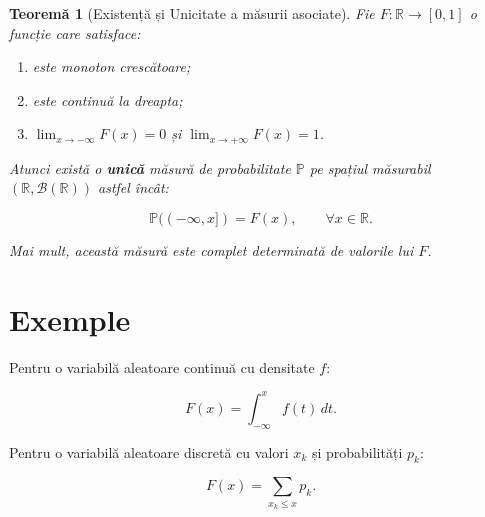 \documentclass[12pt]{article}
\theoremstyle{plain}
\newtheorem{theorem}{Teoremă}
\begin{document}
\begin{theorem}[Existență și Unicitate a măsurii asociate]
Fie $F : \mathbb{R} \to [0,1]$ o funcție care satisface:

\begin{enumerate}
    \item este monoton crescătoare;
    \item este continuă la dreapta;
    \item $\displaystyle \lim_{x \to -\infty} F(x) = 0$ și 
          $\displaystyle \lim_{x \to +\infty} F(x) = 1$.
\end{enumerate}

Atunci există o \textbf{unică} măsură de probabilitate 
$\mathbb{P}$ pe spațiul măsurabil $(\mathbb{R}, \mathcal{B}(\mathbb{R}))$ astfel încât:



\[
\mathbb{P}((-\infty, x]) = F(x), \qquad \forall x \in \mathbb{R}.
\]



Mai mult, această măsură este complet determinată de valorile lui $F$.
\end{theorem}

\section{Exemple}

Pentru o variabilă aleatoare continuă cu densitate $f$:


\[
F(x) = \int_{-\infty}^{x} f(t)\, dt.
\]



Pentru o variabilă aleatoare discretă cu valori $x_k$ și probabilități $p_k$:


\[
F(x) = \sum_{x_k \le x} p_k.
\]
\end{document}
